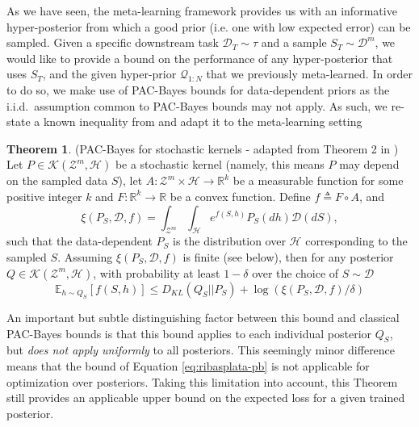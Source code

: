 \documentclass[letterpaper]{article} %
\theoremstyle{definition}
\newtheorem{theorem}{Theorem}[section]
\newcommand{\Expect}[2]{\mathbb{E}_{#1}\left [#2 \right ]}
\begin{document}
As we have seen, the meta-learning framework provides us with an informative hyper-posterior from which a good prior (i.e.\! one with low expected error) can be sampled. Given a specific downstream task $\mathcal{D}_T\sim \tau$ and a sample $S_T\sim \mathcal{D}^m$, we would like to provide a bound on the performance of any hyper-posterior that uses $S_T$, and the given hyper-prior $\mathcal{Q}_{1:N}$ that we previously meta-learned. In order to do so, we make use of PAC-Bayes bounds for data-dependent priors as the i.i.d.\ assumption common to PAC-Bayes bounds may not apply. As such, we re-state a known inequality from \citet{Rivasplata2020} and adapt it to the meta-learning setting

\begin{theorem} (PAC-Bayes for stochastic kernels - adapted from Theorem 2 in \citet{Rivasplata2020}) \label{thm:rivasplata-pb}
	Let $P\in \mathcal{K}(\mathcal{Z}^m, \mathcal{H})$ be a stochastic kernel (namely, this means $P$ may depend on the sampled data $S$), let $A: \mathcal{Z}^m\times \mathcal{H}\rightarrow \mathbb{R}^k$ be a measurable function for some positive integer $k$ and $F:\mathbb{R}^k\rightarrow \mathbb{R}$ be a convex function.
	Define $f\triangleq F\circ A$, and
	$$
	\xi(P_S, \mathcal{D}, f)=\int_{\mathcal{Z}^m}\int_{\mathcal{H}}e^{f(S, h)}P_S(dh)\mathcal{D}(dS),
	$$
	such that the data-dependent $P_S$ is the distribution over $\mathcal{H}$ corresponding to the sampled $S$. Assuming $\xi(P_S, \mathcal{D}, f)$ is finite (see below), then for any posterior $Q\in \mathcal{K}(\mathcal{Z}^m, \mathcal{H})$, with probability at least $1-\delta$ over the choice of $S\sim \mathcal{D}$
	\begin{equation} \label{eq:ribasplata-pb}
	\Expect{h\sim Q_S}{f(S, h)} \leq D_{KL}(Q_S||P_S)+\log\left (\xi(P_S, \mathcal{D}, f)/\delta\right )
	\end{equation}
\end{theorem}

An important but subtle distinguishing factor between this bound and classical PAC-Bayes bounds is that this bound applies to each individual posterior $Q_S$, but \emph{does not apply uniformly} to all posteriors. This seemingly minor difference means that the bound of Equation \ref{eq:ribasplata-pb} is not applicable for optimization over posteriors. Taking this limitation into account, this Theorem still provides an applicable upper bound on the expected loss for a given trained posterior.
\end{document}
